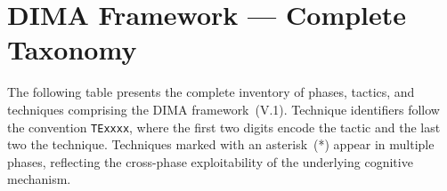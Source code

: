 \documentclass[11pt,a4paper]{article}
\begin{document}
\clearpage
\onecolumn

\appendix
\section{DIMA Framework --- Complete Taxonomy}
\label{app:taxonomy}

The following table presents the complete inventory of phases, tactics, and techniques comprising the DIMA framework~(V.1). Technique identifiers follow the convention \texttt{TExxxx}, where the first two digits encode the tactic and the last two the technique. Techniques marked with an asterisk~(*) appear in multiple phases, reflecting the cross-phase exploitability of the underlying cognitive mechanism.

\vspace{0.5cm}
\end{document}
